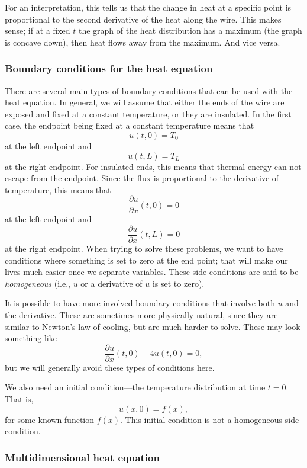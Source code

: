 For an interpretation, this tells us that the change in heat at a specific point is proportional to the second
derivative of the heat along the wire.  This makes sense;
if at a fixed $t$
the graph of the heat distribution has a maximum (the graph is concave down),
then heat flows away from the maximum.  And vice versa.

\subsubsection{Boundary conditions for the heat equation}

There are several main types of boundary conditions that can be used with the heat equation. In general, we will assume that either the ends of the wire are exposed and fixed at a constant temperature, or they are insulated. In the first case, the endpoint being fixed at a constant temperature means that
\[ u(t,0) = T_0 \] at the left endpoint and
\[ u(t,L) = T_L \] at the right endpoint. For insulated ends, this means that thermal energy can not escape from the endpoint. Since the flux is proportional to the derivative of temperature, this means that
\[ \frac{\partial u}{\partial x}(t, 0) = 0 \] at the left endpoint and
\[ \frac{\partial u}{\partial x}(t, L) = 0 \] at the right endpoint. When trying to solve these problems, we want to have conditions where something is set to zero at the end point; that will make our lives much easier once we separate variables. These side conditions are said to be
\emph{homogeneous}
(i.e., $u$ or a derivative of $u$ is set to zero).

It is possible to have more involved boundary conditions that involve both $u$ and the derivative. These are sometimes more physically natural, since they are similar to Newton's law of cooling, but are much harder to solve. These may look something like
\[ \frac{\partial u}{\partial x}(t,0) - 4 u(t,0) = 0, \] but we will generally avoid these types of conditions here. 

We also need an initial condition---the temperature distribution
at time $t=0$.  That is,
\begin{equation*}
u(x,0) = f(x) ,
\end{equation*}
for some known function $f(x)$.
This initial condition is not a homogeneous side condition. 

\subsubsection{Multidimensional heat equation}

